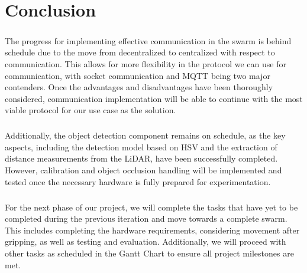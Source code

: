 \chapter{Conclusion}

\paragraph*{}
The progress for implementing effective communication in the swarm is behind schedule due to the move from decentralized to centralized with respect to communication. This allows for more flexibility in the protocol we can use for communication, with socket communication and MQTT being two major contenders. Once the advantages and disadvantages have been thoroughly considered, communication implementation will be able to continue with the most viable protocol for our use case as the solution.

\paragraph*{}
Additionally, the object detection component remains on schedule, as the key aspects, including the detection model based on HSV and the extraction of distance measurements from the LiDAR, have been successfully completed. However, calibration and object occlusion handling will be implemented and tested once the necessary hardware is fully prepared for experimentation.

\paragraph*{}
For the next phase of our project, we will complete the tasks that have yet to be completed during the previous iteration and move towards a complete swarm. This includes completing the hardware requirements, considering movement after gripping, as well as testing and evaluation. Additionally, we will proceed with other tasks as scheduled in the Gantt Chart to ensure all project milestones are met.
